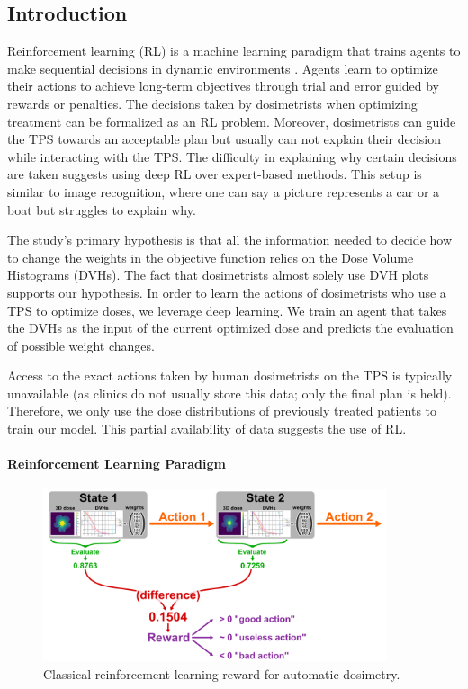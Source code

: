\subsection{Introduction}
Reinforcement learning (RL) is a machine learning paradigm that trains agents to make sequential decisions in dynamic environments \cite{brooks_what_2021}.
Agents learn to optimize their actions to achieve long-term objectives through trial and error guided by rewards or penalties.
The decisions taken by dosimetrists when optimizing treatment can be formalized as an RL problem.
Moreover, dosimetrists can guide the TPS towards an acceptable plan but usually can not explain their decision while interacting with the TPS.
The difficulty in explaining why certain decisions are taken suggests using deep RL over expert-based methods.
This setup is similar to image recognition, where one can say a picture represents a car or a boat but struggles to explain why.

The study’s primary hypothesis is that all the information needed to decide how to change the weights in the objective function relies on the Dose Volume Histograms (DVHs).
The fact that dosimetrists almost solely use DVH plots supports our hypothesis.
In order to learn the actions of dosimetrists who use a TPS to optimize doses, we leverage deep learning.
We train an agent that takes the DVHs as the input of the current optimized dose and predicts the evaluation of possible weight changes.

Access to the exact actions taken by human dosimetrists on the TPS is typically unavailable (as clinics do not usually store this data; only the final plan is held).
Therefore, we only use the dose distributions of previously treated patients to train our model.
This partial availability of data suggests the use of RL.

\paragraph{Reinforcement Learning Paradigm}
\begin{figure}
	\centering
	\includegraphics[width=0.9\textwidth]{AIME/reward.pdf}
	\caption{Classical reinforcement learning reward for automatic dosimetry.}
	\label{fig:reward_fig}
\end{figure}

